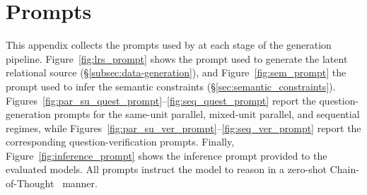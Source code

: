 \section{Prompts}
\label{sec:prompts}

This appendix collects the prompts used by \name{} at each stage of the generation pipeline. Figure~\ref{fig:lrs_prompt} shows the prompt used to generate the latent relational source (\S\ref{subsec:data-generation}), and Figure~\ref{fig:sem_prompt} the prompt used to infer the semantic constraints (\S\ref{sec:semantic_constraints}). Figures~\ref{fig:par_su_quest_prompt}--\ref{fig:seq_quest_prompt} report the question-generation prompts for the same-unit parallel, mixed-unit parallel, and sequential regimes, while Figures~\ref{fig:par_su_ver_prompt}--\ref{fig:seq_ver_prompt} report the corresponding question-verification prompts. Finally, Figure~\ref{fig:inference_prompt} shows the inference prompt provided to the evaluated models. All prompts instruct the model to reason in a zero-shot Chain-of-Thought~\cite{cot} manner.


